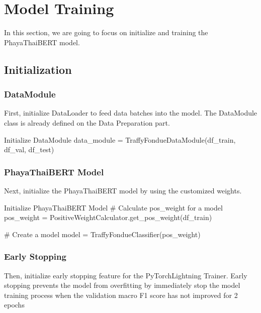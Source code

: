 \documentclass[12pt, a4paper]{article}
\begin{document}
    \pagebreak
    
        \section{Model Training}
            In this section, we are going to focus on initialize and training the PhayaThaiBERT model.

            \subsection{Initialization}
                \subsubsection{DataModule}
                    First, initialize DataLoader to feed data batches into the model.
                    The DataModule class is already defined on the Data Preparation part.

                    \begin{codeblock}{Initialize DataModule}
                        data_module = TraffyFondueDataModule(df_train, df_val, df_test)
                    \end{codeblock}
                
                \subsubsection{PhayaThaiBERT Model}
                    Next, initialize the PhayaThaiBERT model by using the customized weights.

                    \begin{codeblock}{Initialize PhayaThaiBERT Model}
                        # Calculate pos_weight for a model
                        pos_weight = PositiveWeightCalculator.get_pos_weight(df_train)

                        # Create a model
                        model = TraffyFondueClassifier(pos_weight)
                    \end{codeblock}

                \subsubsection{Early Stopping}
                    Then, initialize early stopping feature for the PyTorchLightning Trainer.
                    Early stopping prevents the model from overfitting by immediately stop
                    the model training process when the validation macro F1 score
                    has not improved for 2 epochs
\end{document}
